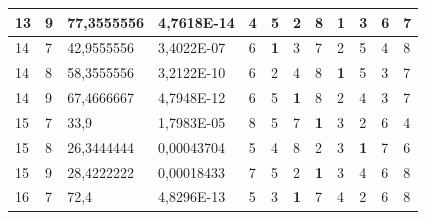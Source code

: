 \documentclass[conference]{IEEEtran}
\begin{document}
\begin{table}[]
\begin{tabular}{|llll|llllllll|}
		\multicolumn{1}{|l|}{13} & \multicolumn{1}{l|}{9} & \multicolumn{1}{l|}{77,3555556} & 4,7618E-14 & \multicolumn{1}{l|}{4} & \multicolumn{1}{l|}{5} & \multicolumn{1}{l|}{2} & \multicolumn{1}{l|}{8} & \multicolumn{1}{l|}{\textbf{1}} & \multicolumn{1}{l|}{3} & \multicolumn{1}{l|}{6} & 7 \\ \hline
		\multicolumn{1}{|l|}{14} & \multicolumn{1}{l|}{7} & \multicolumn{1}{l|}{42,9555556} & 3,4022E-07 & \multicolumn{1}{l|}{6} & \multicolumn{1}{l|}{\textbf{1}} & \multicolumn{1}{l|}{3} & \multicolumn{1}{l|}{7} & \multicolumn{1}{l|}{2} & \multicolumn{1}{l|}{5} & \multicolumn{1}{l|}{4} & 8 \\ \hline
		\multicolumn{1}{|l|}{14} & \multicolumn{1}{l|}{8} & \multicolumn{1}{l|}{58,3555556} & 3,2122E-10 & \multicolumn{1}{l|}{6} & \multicolumn{1}{l|}{2} & \multicolumn{1}{l|}{4} & \multicolumn{1}{l|}{8} & \multicolumn{1}{l|}{\textbf{1}} & \multicolumn{1}{l|}{5} & \multicolumn{1}{l|}{3} & 7 \\ \hline
		\multicolumn{1}{|l|}{14} & \multicolumn{1}{l|}{9} & \multicolumn{1}{l|}{67,4666667} & 4,7948E-12 & \multicolumn{1}{l|}{6} & \multicolumn{1}{l|}{5} & \multicolumn{1}{l|}{\textbf{1}} & \multicolumn{1}{l|}{8} & \multicolumn{1}{l|}{2} & \multicolumn{1}{l|}{4} & \multicolumn{1}{l|}{3} & 7 \\ \hline
		\multicolumn{1}{|l|}{15} & \multicolumn{1}{l|}{7} & \multicolumn{1}{l|}{33,9} & 1,7983E-05 & \multicolumn{1}{l|}{8} & \multicolumn{1}{l|}{5} & \multicolumn{1}{l|}{7} & \multicolumn{1}{l|}{\textbf{1}} & \multicolumn{1}{l|}{3} & \multicolumn{1}{l|}{2} & \multicolumn{1}{l|}{6} & 4 \\ \hline
		\multicolumn{1}{|l|}{15} & \multicolumn{1}{l|}{8} & \multicolumn{1}{l|}{26,3444444} & 0,00043704 & \multicolumn{1}{l|}{5} & \multicolumn{1}{l|}{4} & \multicolumn{1}{l|}{8} & \multicolumn{1}{l|}{2} & \multicolumn{1}{l|}{3} & \multicolumn{1}{l|}{\textbf{1}} & \multicolumn{1}{l|}{7} & 6 \\ \hline
		\multicolumn{1}{|l|}{15} & \multicolumn{1}{l|}{9} & \multicolumn{1}{l|}{28,4222222} & 0,00018433 & \multicolumn{1}{l|}{7} & \multicolumn{1}{l|}{5} & \multicolumn{1}{l|}{2} & \multicolumn{1}{l|}{\textbf{1}} & \multicolumn{1}{l|}{3} & \multicolumn{1}{l|}{4} & \multicolumn{1}{l|}{6} & 8 \\ \hline
		\multicolumn{1}{|l|}{16} & \multicolumn{1}{l|}{7} & \multicolumn{1}{l|}{72,4} & 4,8296E-13 & \multicolumn{1}{l|}{5} & \multicolumn{1}{l|}{3} & \multicolumn{1}{l|}{\textbf{1}} & \multicolumn{1}{l|}{7} & \multicolumn{1}{l|}{4} & \multicolumn{1}{l|}{2} & \multicolumn{1}{l|}{6} & 8 \\ \hline

\end{tabular}
\end{table}
\end{document}
